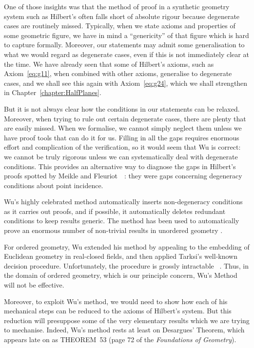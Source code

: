 One of those insights was that the method of proof in a synthetic geometry system such as Hilbert's often falls short of absolute rigour because degenerate cases are routinely missed. Typically, when we state axioms and properties of some geometric figure, we have in mind a ``genericity'' of that figure which is hard to capture formally. Moreover, our statements may admit some generalisation to what we would regard as degenerate cases, even if this is not immediately clear at the time. We have already seen that some of Hilbert's axioms, such as Axiom~\ref{eq:g11}, when combined with other axioms, generalise to degenerate cases, and we shall see this again with Axiom~\ref{eq:g24}, which we shall strengthen in Chapter~\ref{chapter:HalfPlanes}.

But it is not always clear how the conditions in our statements can be relaxed. Moreover, when trying to rule out certain degenerate cases, there are plenty that are easily missed. When we formalise, we cannot simply neglect them unless we have proof tools that can do it for us. Filling in all the gaps requires enormous effort and complication of the verification, so it would seem that Wu is correct: we cannot be truly rigorous unless we can systematically deal with degenerate conditions. This provides an alternative way to diagnose the gaps in Hilbert's proofs spotted by Meikle and Fleuriot~~\cite{MeikleFleuriotFormalizingHilbert}: they were gaps concerning degeneracy conditions about point incidence.

Wu's highly celebrated method automatically inserts non-degeneracy conditions as it carries out proofs, and if possible, it automatically deletes redundant conditions to keep results generic. The method has been used to automatically prove an enormous number of non-trivial results in unordered geometry \cite{MechanicalGeometryTheoremProving}.

For ordered geometry, Wu extended his method by appealing to the embedding of Euclidean geometry in real-closed fields, and then applied Tarksi's well-known decision procedure. Unfortunately, the procedure is grossly intractable ~\cite{TarksiMcNaugtonReview}. Thus, in the domain of ordered geometry, which is our principle concern, Wu's Method will not be effective.

Moreover, to exploit Wu's method, we would need to show how each of his mechanical steps can be reduced to the axioms of Hilbert's system. But this reduction will presuppose some of the very elementary results which we are trying to mechanise. Indeed, Wu's method rests at least on Desargues' Theorem, which appears late on as THEOREM~53 (page 72 of the \emph{Foundations of Geometry}).

